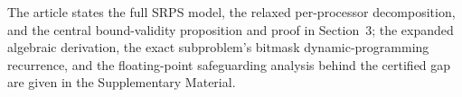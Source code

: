 \documentclass[preprint,12pt]{elsarticle}
\begin{document}
The article states the full SRPS model, the relaxed per-processor decomposition, and the central bound-validity proposition and proof in Section~3; the expanded algebraic derivation, the exact subproblem's bitmask dynamic-programming recurrence, and the floating-point safeguarding analysis behind the certified gap are given in the Supplementary Material.

\FloatBarrier



\end{document}

